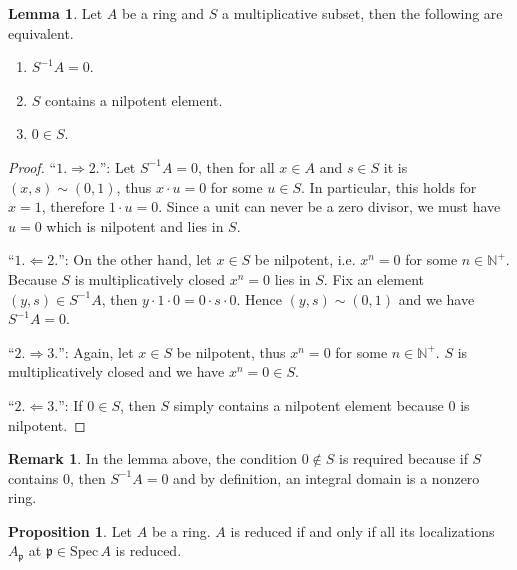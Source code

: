 \documentclass[a4paper]{book}
\theoremstyle{definition}
\newtheorem{lemma}[definition]{Lemma}
\newtheorem{proposition}[definition]{Proposition}
\newtheorem*{remark}{Remark}
\begin{document}
\begin{thmbox}
    \begin{lemma}
        Let \(A\) be a ring and \(S\) a multiplicative subset, then the following are equivalent.
        \begin{enumerate}
            \item \(S^{-1}A = 0\).
            \item \(S\) contains a nilpotent element.
            \item \(0 \in S\).
        \end{enumerate}
    \end{lemma}
\end{thmbox}
\begin{proof}
    ``\(1. \Rightarrow 2.\)'': Let \(S^{-1}A = 0\), then for all \(x \in A\) and \(s \in S\) it is \((x, s) \sim (0, 1)\), thus \(x \cdot u = 0\) for some \(u \in S\). In particular, this holds for \(x = 1\), therefore \(1 \cdot u = 0\). Since a unit can never be a zero divisor, we must have \(u = 0\) which is nilpotent and lies in \(S\).

    ``\(1. \Leftarrow 2.\)'': On the other hand, let \(x \in S\) be nilpotent, i.e. \(x^n = 0\) for some \(n \in \mathbb{N}^+\). Because \(S\) is multiplicatively closed \(x^n = 0\) lies in \(S\). Fix an element \((y, s) \in S^{-1}A\), then \(y \cdot 1 \cdot 0 = 0 \cdot s \cdot 0\). Hence \((y, s) \sim (0, 1)\) and we have \(S^{-1}A = 0\).

    ``\(2. \Rightarrow 3.\)'': Again, let \(x \in S\) be nilpotent, thus \(x^n = 0\) for some \(n \in \mathbb{N}^+\). \(S\) is multiplicatively closed and we have \(x^n = 0 \in S\).

    ``\(2. \Leftarrow 3.\)'': If \(0 \in S\), then \(S\) simply contains a nilpotent element because \(0\) is nilpotent.
\end{proof}


\begin{rembox}
    \begin{remark}
        In the lemma above, the condition \(0 \not\in S\) is required because if \(S\) contains \(0\), then \(S^{-1}A = 0\) and by definition, an integral domain is a nonzero ring.
    \end{remark}
\end{rembox}


\begin{thmbox}
    \begin{proposition}
        Let \(A\) be a ring. \(A\) is reduced if and only if all its localizations \(A_\mathfrak{p}\) at \(\mathfrak{p} \in \mathrm{Spec} \, A\) is reduced.
    \end{proposition}
\end{thmbox}
\end{document}
